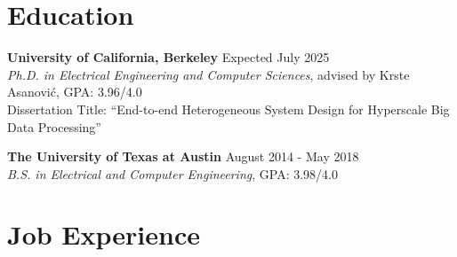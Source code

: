 \documentclass[line]{res}
\begin{document}
\address{\href{https://abejgonzalez.github.io}{https://abejgonzalez.github.io} $|$ \href{mailto:abe.gonzalez@berkeley.edu}{abe.gonzalez@berkeley.edu}}

\begin{resume}

\vspace{-6mm}

\section{\Large{Education}}
\label{sec:education}
\vspace{2mm}

\textbf{University of California, Berkeley} \hfill Expected July 2025
\\
\textit{Ph.D. in Electrical Engineering and Computer Sciences}, advised by Krste Asanovi\'c, GPA: 3.96/4.0
\\
Dissertation Title: ``End-to-end Heterogeneous System Design for Hyperscale Big Data Processing''

\textbf{The University of Texas at Austin} \hfill August 2014 - May 2018
\\
\textit{B.S. in Electrical and Computer Engineering}, GPA: 3.98/4.0

\section{\Large{Job Experience}}
\label{sec:jobs}
\vspace{2mm}


\end{resume}
\end{document}
